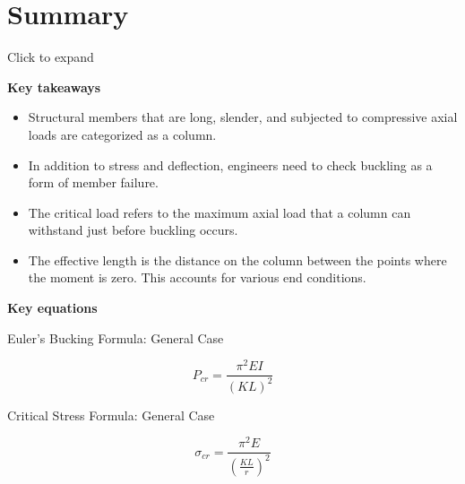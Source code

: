 \documentclass[
  letterpaper,
  DIV=11,
  numbers=noendperiod]{scrreprt}
\begin{document}
\section*{Summary}\label{summary-13}


Click to expand

\begin{tcolorbox}[enhanced jigsaw, breakable, opacityback=0, toptitle=1mm, left=2mm, colback=white, opacitybacktitle=0.6, colframe=quarto-callout-note-color-frame, titlerule=0mm, arc=.35mm, leftrule=.75mm, bottomtitle=1mm, colbacktitle=quarto-callout-note-color!10!white, rightrule=.15mm, title={Note}, bottomrule=.15mm, toprule=.15mm, coltitle=black]

\textbf{Key takeaways}

\begin{itemize}
\item
  Structural members that are long, slender, and subjected to
  compressive axial loads are categorized as a column.
\item
  In addition to stress and deflection, engineers need to check buckling
  as a form of member failure.
\item
  The critical load refers to the maximum axial load that a column can
  withstand just before buckling occurs.
\item
  The effective length is the distance on the column between the points
  where the moment is zero. This accounts for various end conditions.
\end{itemize}

\end{tcolorbox}

\begin{tcolorbox}[enhanced jigsaw, breakable, opacityback=0, toptitle=1mm, left=2mm, colback=white, opacitybacktitle=0.6, colframe=quarto-callout-note-color-frame, titlerule=0mm, arc=.35mm, leftrule=.75mm, bottomtitle=1mm, colbacktitle=quarto-callout-note-color!10!white, rightrule=.15mm, title={Note}, bottomrule=.15mm, toprule=.15mm, coltitle=black]

\textbf{Key equations}

Euler's Bucking Formula: General Case

\[
P_{c r}=\frac{\pi^2 E I}{(K L)^2}
\]

Critical Stress Formula: General Case

\[
\sigma_{c r}=\frac{\pi^2 E}{\left(\frac{K L}{r}\right)^2}
\]

\end{tcolorbox}
\end{document}
